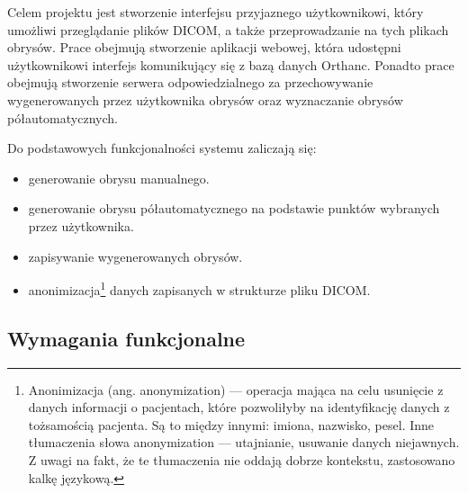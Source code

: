\documentclass[a4paper,11pt,twoside,openright]{report}
\theoremstyle{definition}
\begin{document}
Celem projektu jest stworzenie interfejsu przyjaznego użytkownikowi, który umożliwi
przeglądanie plików DICOM, a także przeprowadzanie na tych plikach obrysów. Prace
obejmują stworzenie aplikacji webowej, która udostępni użytkownikowi interfejs
komunikujący się z bazą danych Orthanc. Ponadto prace obejmują stworzenie serwera
odpowiedzialnego za przechowywanie wygenerowanych przez użytkownika obrysów oraz
wyznaczanie obrysów półautomatycznych.

Do podstawowych funkcjonalności systemu zaliczają się:
\begin{itemize}[noitemsep]
\item generowanie obrysu manualnego.
\item generowanie obrysu półautomatycznego na podstawie punktów wybranych przez użytkownika.
\item zapisywanie wygenerowanych obrysów.
\item anonimizacja\footnote {Anonimizacja (ang. anonymization) --- operacja mająca
na celu usunięcie z danych informacji o pacjentach, które pozwoliłyby na identyfikację
danych z tożsamością pacjenta. Są to między innymi: imiona, nazwisko, pesel.
Inne tłumaczenia słowa anonymization --- utajnianie, usuwanie danych niejawnych.
Z uwagi na fakt, że te tłumaczenia nie oddają dobrze kontekstu, zastosowano kalkę
językową.} danych zapisanych w strukturze pliku DICOM.
\end{itemize}

\subsection {Wymagania funkcjonalne}
\end{document}
